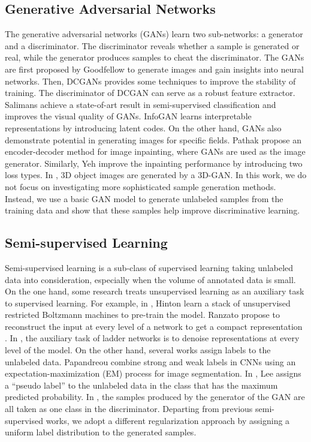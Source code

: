 \documentclass[10pt,twocolumn,letterpaper]{article}
\begin{document}
\subsection{Generative Adversarial Networks}
The generative adversarial networks (GANs) learn two sub-networks: a generator and a discriminator. The discriminator reveals whether a sample is generated or real, while the generator produces samples to cheat the discriminator. The GANs are first proposed by Goodfellow \etal \cite{goodfellow2014generative} to generate images and gain insights into neural networks. Then, DCGANs \cite{radford2015unsupervised} provides some techniques to improve the stability of training. The discriminator of DCGAN can serve as a robust feature extractor. Salimans \etal \cite{salimans2016improved} achieve a state-of-art result in semi-supervised classification and improves the visual quality of GANs. InfoGAN \cite{chen2016infogan} learns interpretable representations by introducing latent codes. On the other hand, GANs also demonstrate potential in generating images for specific fields. Pathak \etal \cite{pathak2016context} propose an encoder-decoder method for image inpainting, where GANs are used as the image generator. Similarly, Yeh \etal \cite{yeh2016semantic} improve the inpainting performance by introducing two loss types. In \cite{wu2016learning}, 3D object images are generated by a 3D-GAN. In this work, we do not focus on investigating more sophisticated sample generation methods. Instead, we use a basic GAN model \cite{radford2015unsupervised} to generate unlabeled samples from the training data and show that these samples help improve discriminative learning.

\subsection{Semi-supervised Learning}
Semi-supervised learning is a sub-class of supervised learning taking unlabeled data into consideration, especially when the volume of annotated data is small.  On the one hand, some research treats unsupervised learning as an auxiliary task to supervised learning. For example, in \cite{hinton2006reducing}, Hinton \etal learn a stack of unsupervised restricted Boltzmann machines to pre-train the model. Ranzato \etal propose to reconstruct the input at every level of a network to get a compact representation \cite{ranzato2008semi}. In \cite{rasmus2015semi}, the auxiliary task of ladder networks is to denoise representations at every level of the model. On the other hand, several works assign labels to the unlabeled data. Papandreou \etal \cite{papandreou2015weakly} combine strong and weak labels in CNNs using an expectation-maximization (EM) process for image segmentation. In \cite{lee2013pseudo}, Lee assigns a ``pseudo label'' to the unlabeled data in the class that has the maximum predicted probability. In \cite{odena2016semi,salimans2016improved}, the samples produced by the generator of the GAN are all taken as one class in the discriminator. Departing from previous semi-supervised works, we adopt a different regularization approach by assigning a uniform label distribution to the generated samples.
\end{document}
